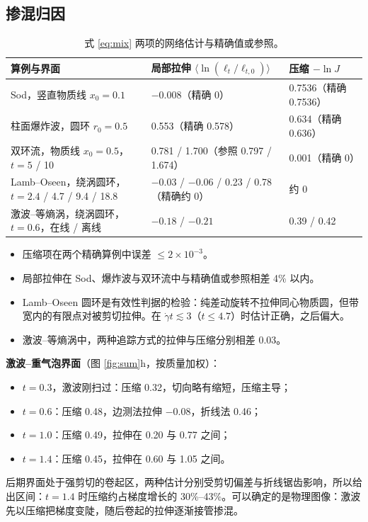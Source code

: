 \documentclass[10.5pt,a4paper]{article}
\begin{document}
\subsection{掺混归因}
\begin{table}[H]\centering\small
\caption{式 \eqref{eq:mix} 两项的网络估计与精确值或参照。}
\begin{tabularx}{\linewidth}{@{}lYY@{}}\toprule
算例与界面 & 局部拉伸 $\langle\ln(\ell_t/\ell_{t,0})\rangle$ & 压缩 $-\ln J$ \\\midrule
Sod，竖直物质线 $x_0=0.1$ & $-0.008$（精确 0） & 0.7536（精确 0.7536） \\
柱面爆炸波，圆环 $r_0=0.5$ & 0.553（精确 0.578） & 0.634（精确 0.636） \\
双环流，物质线 $x_0=0.5$，$t=5$ / 10 & 0.781 / 1.700（参照 0.797 / 1.674） & 0.001（精确 0） \\
Lamb–Oseen，绕涡圆环，$t=2.4$ / 4.7 / 9.4 / 18.8 & $-0.03$ / $-0.06$ / 0.23 / 0.78（精确约 0） & 约 0 \\
激波–等熵涡，绕涡圆环，$t=0.6$，在线 / 离线 & $-0.18$ / $-0.21$ & 0.39 / 0.42 \\
\bottomrule\end{tabularx}
\end{table}
\begin{itemize}
\item 压缩项在两个精确算例中误差 $\le2\times10^{-3}$。
\item 局部拉伸在 Sod、爆炸波与双环流中与精确值或参照相差 4\% 以内。
\item Lamb–Oseen 圆环是有效性判据的检验：纯差动旋转不拉伸同心物质圆，但带宽内的有限点对被剪切拉伸。在 $\dot\gamma t\lesssim3$（$t\le4.7$）时估计正确，之后偏大。
\item 激波–等熵涡中，两种追踪方式的拉伸与压缩分别相差 0.03。
\end{itemize}

\textbf{激波–重气泡界面}（图 \ref{fig:sum}h，按质量加权）：
\begin{itemize}
\item $t=0.3$，激波刚扫过：压缩 0.32，切向略有缩短，压缩主导；
\item $t=0.6$：压缩 0.48，边测法拉伸 $-0.08$，折线法 0.46；
\item $t=1.0$：压缩 0.49，拉伸在 0.20 与 0.77 之间；
\item $t=1.4$：压缩 0.45，拉伸在 0.60 与 1.05 之间。
\end{itemize}
后期界面处于强剪切的卷起区，两种估计分别受剪切偏差与折线锯齿影响，所以给出区间：$t=1.4$ 时压缩约占梯度增长的 30\%–43\%。可以确定的是物理图像：激波先以压缩把梯度变陡，随后卷起的拉伸逐渐接管掺混。
\end{document}
